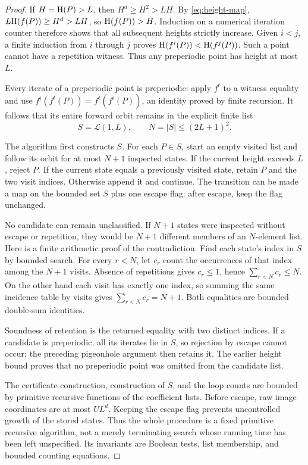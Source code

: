 \begin{proof}
If $H=\mathrm H(P)>L$, then
$H^d\ge H^2>LH$. By \eqref{eq:height-map}, $L\mathrm H(f(P))\ge H^d>LH$,
so $\mathrm H(f(P))>H$. Induction on a numerical iteration counter therefore
shows that all subsequent heights strictly increase. Given $i<j$, a
finite induction from $i$ through $j$ proves
$\mathrm H(f^i(P))<\mathrm H(f^j(P))$. Such a point cannot have a repetition witness.
Thus any preperiodic point has height at most $L$.

Every iterate of a preperiodic point is preperiodic: apply $f^t$ to a
witness equality and use $f^i(f^t(P))=f^t(f^i(P))$, an identity proved by
finite recursion. It follows that its entire forward orbit remains in
the explicit finite list
\[
             S=\mathcal L(1,L),\qquad N=|S|\le(2L+1)^2.
\]

The algorithm first constructs $S$. For each $P\in S$, start an empty
visited list and follow its orbit for at most $N+1$ inspected states. If
the current height exceeds $L$, reject $P$. If the current state equals
a previously visited state, retain $P$ and the two visit indices. Otherwise
append it and continue. The transition can be made a map on the bounded
set $S$ plus one escape flag: after escape, keep the flag unchanged.

No candidate can remain unclassified. If $N+1$ states were inspected
without escape or repetition, they would be $N+1$ different members of an
$N$-element list. Here is a finite arithmetic proof of the contradiction.
Find each state's index in $S$ by bounded search. For every $r<N$, let
$c_r$ count the occurrences of that index among the $N+1$ visits. Absence
of repetitions gives $c_r\le1$, hence $\sum_{r<N}c_r\le N$. On the
other hand each visit has exactly one index, so summing the same incidence
table by visits gives $\sum_{r<N}c_r=N+1$. Both equalities are bounded
double-sum identities.

Soundness of retention is the returned equality with two distinct indices.
If a candidate is preperiodic, all its iterates lie in $S$, so rejection
by escape cannot occur; the preceding pigeonhole argument then retains it.
The earlier height bound proves that no preperiodic point was omitted from
the candidate list.

The certificate construction, construction of $S$, and the loop counts are
bounded by primitive recursive functions of the coefficient lists. Before
escape, raw image coordinates are at most $UL^d$. Keeping the escape flag
prevents uncontrolled growth of the stored states. Thus the whole procedure
is a fixed primitive recursive algorithm, not a merely terminating search
whose running time has been left unspecified. Its invariants are Boolean
tests, list membership, and bounded counting equations.
\end{proof}

